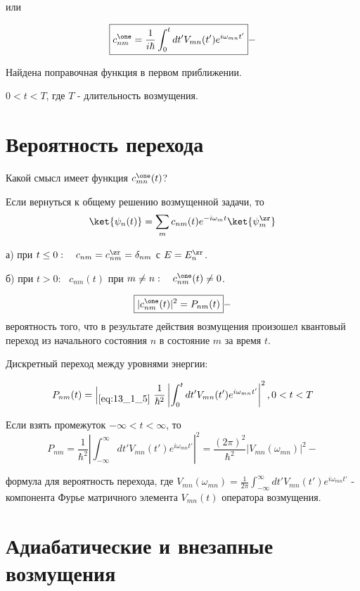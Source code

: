 или

\begin{equation*}
\boxed{c_{nm}^\one = \frac{1}{i\hbar} \int_0^t dt' V_{mn}(t') e^{i \omega_{mn} t'}} -
\end{equation*}

Найдена поправочная функция в первом приближении.

$0 < t < T$, где $T$ - длительность возмущения.

\section{Вероятность перехода}

Какой смысл имеет функция $c_{mn}^\one (t)$?

Если вернуться к общему решению возмущенной задачи, то 
$$
\ket{\psi_n(t)} = \sum_m c_{nm}(t) e^{-i \omega_m t} \ket{\psi_m^\zr}
$$

а) при $t \le 0: ~~~c_{nm} = c_{nm}^\zr = \delta_{nm}$ с $E=E_n^\zr$.

б) при $t > 0: ~~~c_{nm}(t)$ при $m \not = n:~~~c_{nm}^\one(t) \not = 0$.

$$
\boxed{|c_{nm}^\one (t)|^2 = P_{nm}(t)} -
$$
вероятность того, что в результате действия возмущения произошел квантовый переход из начального состояния $n$ в состояние $m$ за время $t$.

Дискретный переход между уровнями энергии:

$$
P_{nm}(t) =\left |_{\eqref{eq:13_1_5}} \right. \frac{1}{\hbar^2} \left | \int_0^t dt' V_{mn}(t') e^{i \omega_{mn} t'} \right |^2, 0 < t < T
$$

Если взять промежуток $-\infty < t < \infty$, то 
$$
P_{nm} = \frac{1}{\hbar^2} \left | \int_{-\infty}^\infty dt' V_{mn}(t')e^{i \omega_{mn}t'} \right |^2 = \frac{(2\pi)^2}{\hbar^2} \left | V_{mn}(\omega_{mn})\right|^2 - 
$$

формула для вероятность перехода, где $V_{mn}(\omega_{mn}) = \frac{1}{2\pi} \int_{-\infty}^\infty dt' V_{mn}(t') e^{i\omega_{mn}t'}$ - компонента Фурье матричного элемента $V_{mn}(t)$ оператора возмущения.

\section{Адиабатические и внезапные возмущения}

